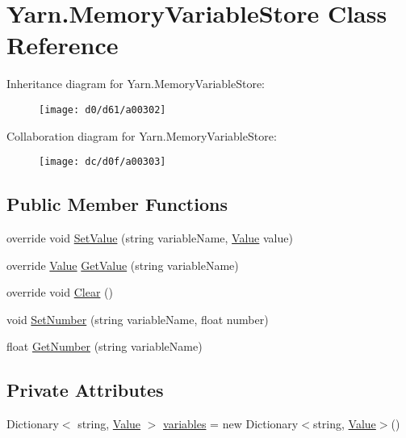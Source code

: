 \hypertarget{a00052}{\section{Yarn.\-Memory\-Variable\-Store Class Reference}
\label{a00052}
}


Inheritance diagram for Yarn.\-Memory\-Variable\-Store\-:
\nopagebreak
\begin{figure}[H]
\begin{center}
\leavevmode
\texttt{[image: d0/d61/a00302]}
\end{center}
\end{figure}


Collaboration diagram for Yarn.\-Memory\-Variable\-Store\-:
\nopagebreak
\begin{figure}[H]
\begin{center}
\leavevmode
\texttt{[image: dc/d0f/a00303]}
\end{center}
\end{figure}
\subsection*{Public Member Functions}
\begin{DoxyCompactItemize}
\item 
override void \hyperlink{a00052_a653a459811e5c19549f4b31269093ef5}{Set\-Value} (string variable\-Name, \hyperlink{a00086}{Value} value)
\item 
override \hyperlink{a00086}{Value} \hyperlink{a00052_a0ce77e8245c504a777540e359704aa2a}{Get\-Value} (string variable\-Name)
\item 
override void \hyperlink{a00052_aa6d243e7ef02b91f793a221f509dae69}{Clear} ()
\item 
void \hyperlink{a00021_a48b93de9cd7ae61d0cd9583c8330d3ee}{Set\-Number} (string variable\-Name, float number)
\item 
float \hyperlink{a00021_a1b7f7f4468b2463e7b47986d99362279}{Get\-Number} (string variable\-Name)
\end{DoxyCompactItemize}
\subsection*{Private Attributes}
\begin{DoxyCompactItemize}
\item 
Dictionary$<$ string, \hyperlink{a00086}{Value} $>$ \hyperlink{a00052_aad18acd95297edb8ed496857337f8071}{variables} = new Dictionary$<$string, \hyperlink{a00086}{Value}$>$()
\end{DoxyCompactItemize}


